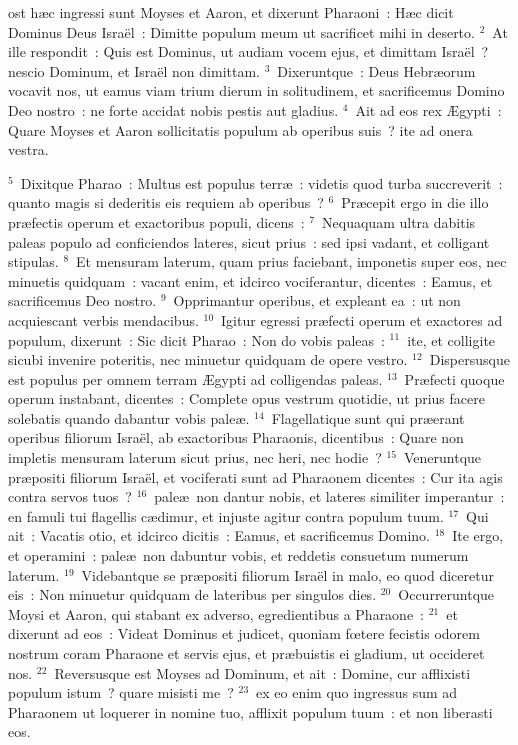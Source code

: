 \bchapter
{}ost h\ae c ingressi sunt Moyses et Aaron, et dixerunt Pharaoni~: H\ae c dicit Dominus Deus Isra\"el~: Dimitte populum meum ut sacrificet mihi in deserto.
${}^{2}$~At ille respondit~: Quis est Dominus, ut audiam vocem ejus, et dimittam Isra\"el~? nescio Dominum, et Isra\"el non dimittam.
${}^{3}$~Dixeruntque~: Deus Hebr\ae orum vocavit nos, ut eamus viam trium dierum in solitudinem, et sacrificemus Domino Deo nostro~: ne forte accidat nobis pestis aut gladius.
${}^{4}$~Ait ad eos rex \AE gypti~: Quare Moyses et Aaron sollicitatis populum ab operibus suis~? ite ad onera vestra.


${}^{5}$~Dixitque Pharao~: Multus est populus terr\ae~: videtis quod turba succreverit~: quanto magis si dederitis eis requiem ab operibus~?
${}^{6}$~Pr\ae cepit ergo in die illo pr\ae fectis operum et exactoribus populi, dicens~:
${}^{7}$~Nequaquam ultra dabitis paleas populo ad conficiendos lateres, sicut prius~: sed ipsi vadant, et colligant stipulas.
${}^{8}$~Et mensuram laterum, quam prius faciebant, imponetis super eos, nec minuetis quidquam~: vacant enim, et idcirco vociferantur, dicentes~: Eamus, et sacrificemus Deo nostro.
${}^{9}$~Opprimantur operibus, et expleant ea~: ut non acquiescant verbis mendacibus.
${}^{10}$~Igitur egressi pr\ae fecti operum et exactores ad populum, dixerunt~: Sic dicit Pharao~: Non do vobis paleas~:
${}^{11}$~ite, et colligite sicubi invenire poteritis, nec minuetur quidquam de opere vestro.
${}^{12}$~Dispersusque est populus per omnem terram \AE gypti ad colligendas paleas.
${}^{13}$~Pr\ae fecti quoque operum instabant, dicentes~: Complete opus vestrum quotidie, ut prius facere solebatis quando dabantur vobis pale\ae .
${}^{14}$~Flagellatique sunt qui pr\ae erant operibus filiorum Isra\"el, ab exactoribus Pharaonis, dicentibus~: Quare non impletis mensuram laterum sicut prius, nec heri, nec hodie~?
${}^{15}$~Veneruntque pr\ae positi filiorum Isra\"el, et vociferati sunt ad Pharaonem dicentes~: Cur ita agis contra servos tuos~?
${}^{16}$~pale\ae\ non dantur nobis, et lateres similiter imperantur~: en famuli tui flagellis c\ae dimur, et injuste agitur contra populum tuum.
${}^{17}$~Qui ait~: Vacatis otio, et idcirco dicitis~: Eamus, et sacrificemus Domino.
${}^{18}$~Ite ergo, et operamini~: pale\ae\ non dabuntur vobis, et reddetis consuetum numerum laterum.
${}^{19}$~Videbantque se pr\ae positi filiorum Isra\"el in malo, eo quod diceretur eis~: Non minuetur quidquam de lateribus per singulos dies.
${}^{20}$~Occurreruntque Moysi et Aaron, qui stabant ex adverso, egredientibus a Pharaone~:
${}^{21}$~et dixerunt ad eos~: Videat Dominus et judicet, quoniam fœtere fecistis odorem nostrum coram Pharaone et servis ejus, et pr\ae buistis ei gladium, ut occideret nos.
${}^{22}$~Reversusque est Moyses ad Dominum, et ait~: Domine, cur afflixisti populum istum~? quare misisti me~?
${}^{23}$~ex eo enim quo ingressus sum ad Pharaonem ut loquerer in nomine tuo, afflixit populum tuum~: et non liberasti eos.

